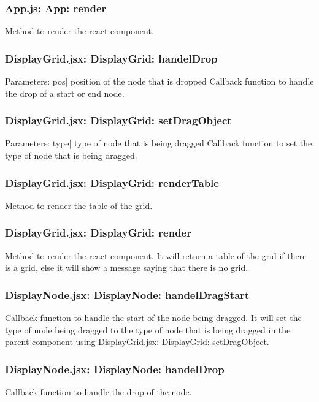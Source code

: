 \documentclass[titlepage]{article}
\begin{document}
\subsubsection{App.js: App: render}
Method to render the react component.

\subsubsection{DisplayGrid.jsx: DisplayGrid: handelDrop}
Parameters:\newline
\indent pos| position of the node that is dropped\newline
Callback function to handle the drop of a start or end node.

\subsubsection{DisplayGrid.jsx: DisplayGrid: setDragObject}
Parameters:\newline
\indent type| type of node that is being dragged\newline
Callback function to set the type of node that is being dragged.

\subsubsection{DisplayGrid.jsx: DisplayGrid: renderTable}
Method to render the table of the grid.

\subsubsection{DisplayGrid.jsx: DisplayGrid: render}
Method to render the react component. It will return a table of the grid if there is a grid, else it will show a message saying that there is no grid.

\subsubsection{DisplayNode.jsx: DisplayNode: handelDragStart}
Callback function to handle the start of the node being dragged. It will set the type of node being dragged to the type of node that is being dragged in the parent component using DisplayGrid.jsx: DisplayGrid: setDragObject.

\subsubsection{DisplayNode.jsx: DisplayNode: handelDrop}
Callback function to handle the drop of the node.
\end{document}
